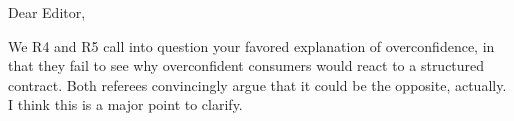 

Dear Editor, 

We 
     R4 and R5 call into question your favored explanation of overconfidence, in that they fail to see why overconfident consumers would react to a structured contract. Both referees convincingly argue that it could be the opposite, actually. I think this is a major point to clarify. 
